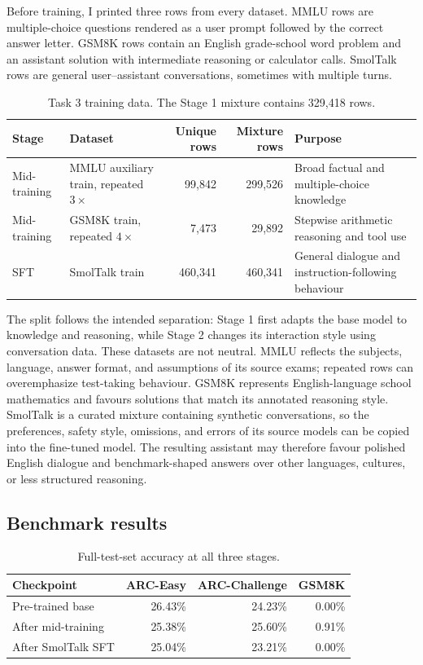 \documentclass{article}
\begin{document}
Before training, I printed three rows from every dataset. MMLU rows are
multiple-choice questions rendered as a user prompt followed by the correct
answer letter. GSM8K rows contain an English grade-school word problem and an
assistant solution with intermediate reasoning or calculator calls. SmolTalk
rows are general user--assistant conversations, sometimes with multiple turns.

\begin{table}[t]
\centering
\small
\caption{Task 3 training data. The Stage 1 mixture contains 329,418 rows.}
\label{tab:task3-data}
\begin{tabularx}{\textwidth}{@{}llrrY@{}}
\toprule
Stage & Dataset & Unique rows & Mixture rows & Purpose \\
\midrule
Mid-training & MMLU auxiliary train, repeated $3\times$ & 99,842 & 299,526
& Broad factual and multiple-choice knowledge \\
Mid-training & GSM8K train, repeated $4\times$ & 7,473 & 29,892
& Stepwise arithmetic reasoning and tool use \\
SFT & SmolTalk train & 460,341 & 460,341
& General dialogue and instruction-following behaviour \\
\bottomrule
\end{tabularx}
\end{table}

The split follows the intended separation: Stage 1 first adapts the base model
to knowledge and reasoning, while Stage 2 changes its interaction style using
conversation data. These datasets are not neutral. MMLU reflects the subjects,
language, answer format, and assumptions of its source exams; repeated rows can
overemphasize test-taking behaviour. GSM8K represents English-language school
mathematics and favours solutions that match its annotated reasoning style.
SmolTalk is a curated mixture containing synthetic conversations, so the
preferences, safety style, omissions, and errors of its source models can be
copied into the fine-tuned model. The resulting assistant may therefore favour
polished English dialogue and benchmark-shaped answers over other languages,
cultures, or less structured reasoning.

\subsection{Benchmark results}

\begin{table}[ht]
\centering
\small
\caption{Full-test-set accuracy at all three stages.}
\label{tab:task3-results}
\begin{tabular}{@{}lrrr@{}}
\toprule
Checkpoint & ARC-Easy & ARC-Challenge & GSM8K \\
\midrule
Pre-trained base & 26.43\% & 24.23\% & 0.00\% \\
After mid-training & 25.38\% & 25.60\% & 0.91\% \\
After SmolTalk SFT & 25.04\% & 23.21\% & 0.00\% \\
\bottomrule
\end{tabular}
\end{table}
\end{document}
